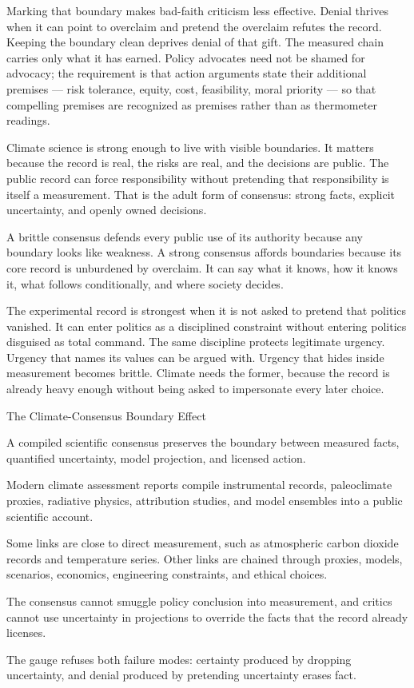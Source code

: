 Marking that boundary makes bad-faith criticism less effective. Denial
thrives when it can point to overclaim and pretend the overclaim
refutes the record. Keeping the boundary clean deprives denial of that
gift. The measured chain carries only what it has earned. Policy
advocates need not be shamed for advocacy; the requirement is that
action arguments state their additional premises --- risk tolerance,
equity, cost, feasibility, moral priority --- so that compelling
premises are recognized as premises rather than as thermometer
readings.

Climate science is strong enough to live with visible boundaries. It
matters because the record is real, the risks are real, and the
decisions are public. The public record can force responsibility
without pretending that responsibility is itself a measurement. That is the adult form of consensus: strong facts,
explicit uncertainty, and openly owned decisions.

A brittle consensus defends every public use of its authority because
any boundary looks like weakness. A strong consensus affords boundaries
because its core record is unburdened by overclaim. It can say what it
knows, how it knows it, what follows conditionally, and where society
decides.

The experimental record is strongest when it is not asked to pretend
that politics vanished. It can enter politics as a disciplined
constraint without entering politics disguised as total command. The
same discipline protects legitimate urgency. Urgency that names its
values can be argued with. Urgency that hides inside measurement
becomes brittle. Climate needs the former, because the record is
already heavy enough without being asked to impersonate every later
choice.

\begin{phenom}{The Climate-Consensus Boundary Effect~\cite{arrhenius1896,ipcc2021,nas2021reflecting}}
\label{ph:climate-consensus-boundary}

\PhStatement
A compiled scientific consensus preserves the boundary between measured
facts, quantified uncertainty, model projection, and licensed action.

\PhOrigin
Modern climate assessment reports compile instrumental records, paleoclimate
proxies, radiative physics, attribution studies, and model ensembles into a
public scientific account.

\PhObservation
Some links are close to direct measurement, such as atmospheric carbon dioxide
records and temperature series. Other links are chained through proxies,
models, scenarios, economics, engineering constraints, and ethical choices.

\PhConstraint
The consensus cannot smuggle policy conclusion into measurement, and critics
cannot use uncertainty in projections to override the facts that the record
already licenses.

\PhConsequence
The gauge refuses both failure modes: certainty produced by dropping
uncertainty, and denial produced by pretending uncertainty erases fact.
\end{phenom}

